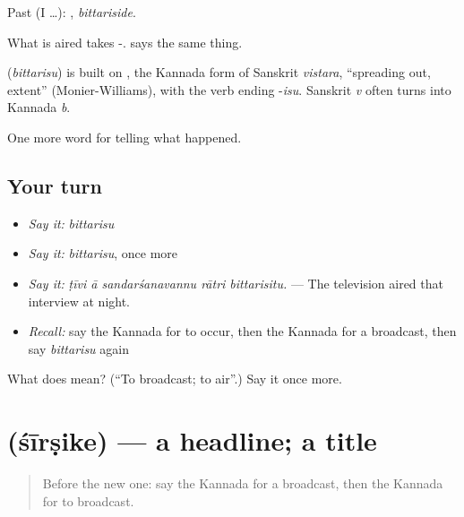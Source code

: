 Past (I …): , \emph{bittariside}.

What is aired takes -.   says the same thing.

\begin{cousinweb}
\textbf{} (\emph{bittarisu}) is built on , the Kannada form of Sanskrit \emph{vistara}, \textquotedblleft{}spreading out, extent\textquotedblright{} (Monier-Williams), with the verb ending -\emph{isu}. Sanskrit \emph{v} often turns into Kannada \emph{b}.
\end{cousinweb}

\begin{grammarlens}[title={What you've built}]
One more word for telling what happened.
\end{grammarlens}

\subsection*{Your turn}
\begin{itemize}
\raggedright
  \item \emph{Say it:} \emph{bittarisu}
  \item \emph{Say it:} \emph{bittarisu}, once more
  \item \emph{Say it:} \emph{ṭīvi ā sandarśanavannu rātri bittarisitu.} — The television aired that interview at night.
  \item \emph{Recall:} say the Kannada for to occur, then the Kannada for a broadcast, then say \emph{bittarisu} again
\end{itemize}

\begin{tcolorbox}[breakable,colback=teal!4,colframe=teal!35!black,title={Before you move on}]
What does  mean? (\textquotedblleft{}To broadcast; to air\textquotedblright{}.) Say it once more.
\end{tcolorbox}
\section[\texorpdfstring{\kn{ಶೀರ್ಷಿಕೆ} (śīrṣike)}{ಶೀರ್ಷಿಕೆ (śīrṣike)}]{ (śīrṣike) — a headline; a title}

\label{lesson:KA-C320-sirsike}



\begin{quote}
Before the new one: say the Kannada for a broadcast, then the Kannada for to broadcast.
\end{quote}

